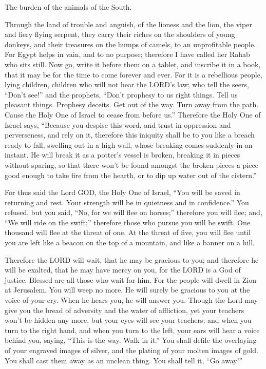  The burden of the animals of the South.

Through the land of trouble and anguish, of the lioness and the lion,
the viper and fiery flying serpent, they carry their riches on the
shoulders of young donkeys, and their treasures on the humps of camels,
to an unprofitable people.  For Egypt helps in vain, and to
no purpose; therefore I have called her Rahab who sits still.
 Now go, write it before them on a tablet, and inscribe it
in a book, that it may be for the time to come forever and ever.
 For it is a rebellious people, lying children, children who
will not hear the LORD's law;  who tell the seers, ``Don't
see!'' and the prophets, ``Don't prophesy to us right things. Tell us
pleasant things. Prophesy deceits.  Get out of the way.
Turn away from the path. Cause the Holy One of Israel to cease from
before us.''  Therefore the Holy One of Israel says,
``Because you despise this word, and trust in oppression and
perverseness, and rely on it,  therefore this iniquity
shall be to you like a breach ready to fall, swelling out in a high
wall, whose breaking comes suddenly in an instant.  He will
break it as a potter's vessel is broken, breaking it in pieces without
sparing, so that there won't be found amongst the broken pieces a piece
good enough to take fire from the hearth, or to dip up water out of the
cistern.''

 For thus said the Lord GOD, the Holy One of Israel, ``You
will be saved in returning and rest. Your strength will be in quietness
and in confidence.'' You refused,  but you said, ``No, for
we will flee on horses;'' therefore you will flee; and, ``We will ride
on the swift;'' therefore those who pursue you will be swift.
 One thousand will flee at the threat of one. At the threat
of five, you will flee until you are left like a beacon on the top of a
mountain, and like a banner on a hill.

 Therefore the LORD will wait, that he may be gracious to
you; and therefore he will be exalted, that he may have mercy on you,
for the LORD is a God of justice. Blessed are all those who wait for
him.  For the people will dwell in Zion at Jerusalem. You
will weep no more. He will surely be gracious to you at the voice of
your cry. When he hears you, he will answer you.  Though
the Lord may give you the bread of adversity and the water of
affliction, yet your teachers won't be hidden any more, but your eyes
will see your teachers;  and when you turn to the right
hand, and when you turn to the left, your ears will hear a voice behind
you, saying, ``This is the way. Walk in it.''  You shall
defile the overlaying of your engraved images of silver, and the plating
of your molten images of gold. You shall cast them away as an unclean
thing. You shall tell it, ``Go away!''

